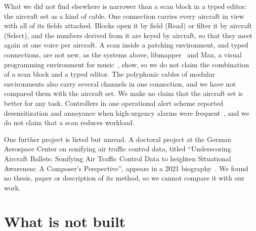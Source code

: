 \documentclass[11pt,letterpaper]{article}
\begin{document}
What we did not find elsewhere is narrower than a scan block in a typed editor: the aircraft set as a kind of cable. One connection carries every aircraft in view with all of its fields attached. Blocks open it by field (Read) or filter it by aircraft (Select), and the numbers derived from it are keyed by aircraft, so that they meet again at one voice per aircraft. A scan inside a patching environment, and typed connections, are not new, as the systems above, libmapper~\cite{libmapper2026} and Max, a visual programming environment for music~\cite{cycling74msp}, show, so we do not claim the combination of a scan block and a typed editor. The polyphonic cables of modular environments also carry several channels in one connection, and we have not compared them with the aircraft set. We make no claim that the aircraft set is better for any task. Controllers in one operational alert scheme reported desensitization and annoyance when high-urgency alarms were frequent~\cite{cabrera2006considerations}, and we do not claim that a scan reduces workload.

One further project is listed but unread. A doctoral project at the German Aerospace Center on sonifying air traffic control data, titled ``Underscoring Aircraft Ballets: Sonifying Air Traffic Control Data to heighten Situational Awareness: A Composer's Perspective'', appears in a 2021 biography~\cite{vondernahmer2021bio}. We found no thesis, paper or description of its method, so we cannot compare it with our work.

\section{What is not built}\label{sec:limits}
\end{document}
